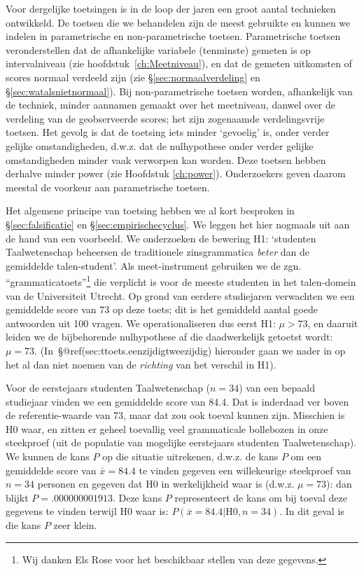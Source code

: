 \documentclass[
]{book}
\begin{document}
Voor dergelijke toetsingen is in de loop der jaren
een groot aantal technieken ontwikkeld. De toetsen die we behandelen
zijn de meest gebruikte en kunnen we indelen in parametrische en
non-parametrische toetsen. Parametrische toetsen veronderstellen dat de
afhankelijke variabele (tenminste) gemeten is op intervalniveau (zie
hoofdstuk~\ref{ch:Meetniveau}), en dat de gemeten uitkomsten of scores
normaal verdeeld zijn (zie
§\ref{sec:normaalverdeling} en
§\ref{sec:watalsnietnormaal}). Bij non-parametrische toetsen
worden, afhankelijk van de techniek, minder aannamen gemaakt over het
meetniveau, danwel over de verdeling van de geobserveerde scores; het
zijn zogenaamde verdelingsvrije toetsen. Het gevolg is dat de toetsing
iets minder `gevoelig' is, onder verder gelijke omstandigheden, d.w.z.
dat de nulhypothese onder verder gelijke omstandigheden minder vaak
verworpen kan worden. Deze toetsen hebben derhalve minder power (zie
Hoofdstuk \ref{ch:power}). Onderzoekers geven daarom meestal de voorkeur
aan parametrische toetsen.

Het algemene principe van toetsing hebben we al kort besproken in
§\ref{sec:falsificatie} en
§\ref{sec:empirischecyclus}.
We leggen het hier nogmaals uit aan
de hand van een voorbeeld. We onderzoeken de bewering H1: `studenten
Taalwetenschap beheersen de traditionele zinsgrammatica \emph{beter} dan de
gemiddelde talen-student'. Als meet-instrument gebruiken we de zgn.
``grammaticatoets''\footnote{Wij danken Els Rose voor het beschikbaar stellen van deze gegevens.} die verplicht is voor de meeste studenten in het
talen-domein van de Universiteit Utrecht. Op grond van eerdere
studiejaren verwachten we een gemiddelde score van 73 op deze toets; dit
is het gemiddeld aantal goede antwoorden uit 100 vragen. We
operationaliseren dus eerst H1: \(\mu > 73\), en daaruit leiden we de
bijbehorende nulhypothese af die daadwerkelijk getoetst wordt:
\(\mu = 73\).
(In~§@ref(sec:ttoets.eenzijdigtweezijdig) hieronder gaan we nader in
op het al dan niet noemen van de \emph{richting} van het verschil in H1).

Voor de
eerstejaars studenten Taalwetenschap (\(n=34\)) van een bepaald studiejaar
vinden we een gemiddelde score van 84.4. Dat is inderdaad ver boven de
referentie-waarde van 73, maar dat zou ook toeval kunnen zijn. Misschien
is H0 waar, en zitten er geheel toevallig veel grammaticale bollebozen
in onze steekproef (uit de populatie van mogelijke eerstejaars studenten
Taalwetenschap). We kunnen de kans \(P\) op die situatie uitrekenen,
d.w.z. de kans \(P\) om een gemiddelde score van \(\overline{x}=84.4\) te
vinden gegeven een willekeurige steekproef van \(n=34\) personen en
gegeven dat H0 in werkelijkheid waar is (d.w.z. \(\mu=73\)): dan blijkt
\(P=.000000001913\). Deze kans \(P\) representeert de kans om bij toeval
deze gegevens te vinden terwijl H0 waar is:
\(P(\overline{x}=84.4|\textrm{H0},n=34)\). In dit geval is die kans \(P\)
zeer klein.
\end{document}
